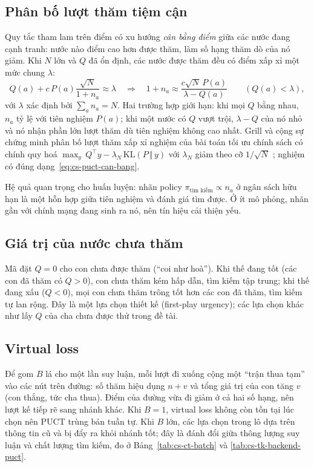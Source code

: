 \subsection{Phân bố lượt thăm tiệm cận}
Quy tắc tham lam trên điểm có xu hướng \emph{cân bằng điểm} giữa các nước đang cạnh tranh: nước nào điểm cao hơn
được thăm, làm số hạng thăm dò của nó giảm. Khi $N$ lớn và $Q$ đã ổn định, các nước được thăm đều có điểm xấp xỉ
một mức chung $\lambda$:
\begin{equation}
  Q(a)+c\,P(a)\frac{\sqrt N}{1+n_a}\approx\lambda
  \quad\Longrightarrow\quad
  1+n_a\approx \frac{c\sqrt N\,P(a)}{\lambda-Q(a)}\qquad(Q(a)<\lambda),
  \label{eq:cs-puct-can-bang}
\end{equation}
với $\lambda$ xác định bởi $\sum_a n_a=N$. Hai trường hợp giới hạn: khi mọi $Q$ bằng nhau, $n_a$ tỷ lệ với tiên
nghiệm $P(a)$; khi một nước có $Q$ vượt trội, $\lambda-Q$ của nó nhỏ và nó nhận phần lớn lượt thăm dù tiên nghiệm
không cao nhất. Grill và cộng sự chứng minh phân bố lượt thăm xấp xỉ nghiệm của bài toán tối ưu chính sách có
chính quy hoá $\max_y\,Q^\top y-\lambda_N\,\mathrm{KL}(P\,\Vert\,y)$ với $\lambda_N$ giảm theo cỡ $1/\sqrt N$
\cite{grill2020mcts}; nghiệm có đúng dạng~\eqref{eq:cs-puct-can-bang}.

Hệ quả quan trọng cho huấn luyện: nhãn policy $\pi_{\text{tìm kiếm}}\propto n_a$ ở ngân sách hữu hạn là một hỗn
hợp giữa tiên nghiệm và đánh giá tìm được. Ở ít mô phỏng, nhãn gần với chính mạng đang sinh ra nó, nên tín hiệu
cải thiện yếu.

\subsection{Giá trị của nước chưa thăm}
Mã đặt $Q=0$ cho con chưa được thăm (``coi như hoà''). Khi thế đang tốt (các con đã thăm có $Q>0$), con chưa thăm
kém hấp dẫn, tìm kiếm tập trung; khi thế đang xấu ($Q<0$), mọi con chưa thăm trông tốt hơn các con đã thăm, tìm
kiếm tự lan rộng. Đây là một lựa chọn thiết kế (first-play urgency); các lựa chọn khác như lấy $Q$ của cha chưa
được thử trong đề tài.

\subsection{Virtual loss}
Để gom $B$ lá cho một lần suy luận, mỗi lượt đi xuống cộng một ``trận thua tạm'' vào các nút trên đường: số thăm
hiệu dụng $n+v$ và tổng giá trị của con tăng $v$ (con thắng, tức cha thua). Điểm của đường vừa đi giảm ở cả hai
số hạng, nên lượt kế tiếp rẽ sang nhánh khác. Khi $B=1$, virtual loss không còn tồn tại lúc chọn nên PUCT trùng
bản tuần tự. Khi $B$ lớn, các lựa chọn trong lô dựa trên thông tin cũ và bị đẩy ra khỏi nhánh tốt; đây là đánh
đổi giữa thông lượng suy luận và chất lượng tìm kiếm, đo ở Bảng~\ref{tab:cs-ct-batch} và
\ref{tab:cs-tk-backend-puct}.


